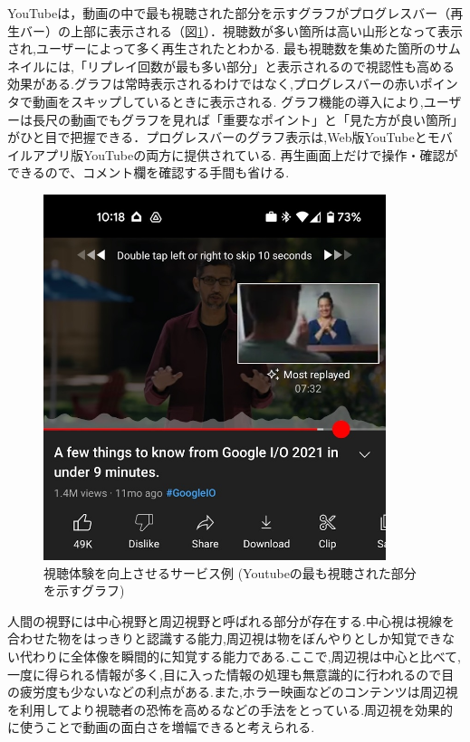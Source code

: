 YouTubeは，動画の中で最も視聴された部分を示すグラフがプログレスバー（再生バー）の上部に表示される（図\ref{youtube}）．視聴数が多い箇所は高い山形となって表示され,ユーザーによって多く再生されたとわかる.
最も視聴数を集めた箇所のサムネイルには,「リプレイ回数が最も多い部分」と表示されるので視認性も高める効果がある.グラフは常時表示されるわけではなく,プログレスバーの赤いポインタで動画をスキップしているときに表示される.
グラフ機能の導入により,ユーザーは長尺の動画でもグラフを見れば「重要なポイント」と「見た方が良い箇所」がひと目で把握できる．プログレスバーのグラフ表示は,Web版YouTubeとモバイルアプリ版YouTubeの両方に提供されている.
再生画面上だけで操作・確認ができるので、コメント欄を確認する手間も省ける.

\begin{figure}[H]
    \centering
    \includegraphics[width=10cm]{images/chapter1/YouTube.jpeg}
    \caption{視聴体験を向上させるサービス例 (Youtubeの最も視聴された部分を示すグラフ)}
    \label{youtube}
\end{figure}

人間の視野には中心視野と周辺視野と呼ばれる部分が存在する.中心視は視線を合わせた物をはっきりと認識する能力,周辺視は物をぼんやりとしか知覚できない代わりに全体像を瞬間的に知覚する能力である.ここで,周辺視は中心と比べて,
一度に得られる情報が多く,目に入った情報の処理も無意識的に行われるので目の疲労度も少ないなどの利点がある.また,ホラー映画などのコンテンツは周辺視を利用してより視聴者の恐怖を高めるなどの手法をとっている.周辺視を効果的に使うことで動画の面白さを増幅できると考えられる.

